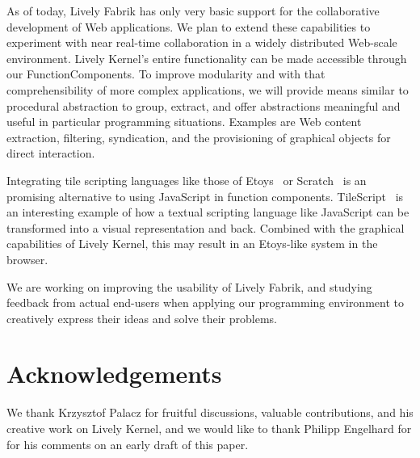 \documentclass[pdftex, times, 10pt, twocolumn]{article}
\begin{document}
As of today, Lively Fabrik has only very basic support for the collaborative development of Web applications. We plan to extend these capabilities to experiment with near real-time collaboration in a widely distributed Web-scale environment. Lively Kernel's entire functionality can be made accessible through our FunctionComponents. To improve modularity and with that comprehensibility of more complex applications, we will provide means similar to procedural abstraction to group, extract, and offer abstractions meaningful and useful in particular programming situations. Examples are Web content extraction, filtering, syndication, and the provisioning of graphical objects for direct interaction. 

Integrating tile scripting languages like those of Etoys~\cite{Kay2005SEA} or Scratch~\cite{Maloney2004SSP} is an promising alternative to using JavaScript in function components. TileScript~\cite{Warth2008TMS} is an interesting example of how a textual scripting language like JavaScript can be transformed into a visual representation and back. Combined with the graphical capabilities of Lively Kernel, this may result in an Etoys-like system in the browser. 

We are working on improving the usability of Lively Fabrik, and studying feedback from actual end-users when applying our programming environment to creatively express their ideas and solve their problems. 



\section{Acknowledgements}
We thank Krzysztof Palacz for fruitful discussions, valuable contributions, and his creative work on Lively Kernel, and we would like to thank Philipp Engelhard for for his comments on an early draft of this paper.  

 



 
\end{document}
